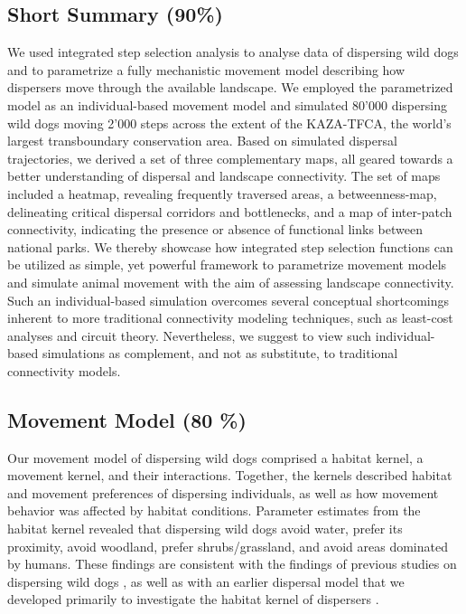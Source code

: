 \documentclass[abstract=on,10pt,a4paper,bibliography=totocnumbered]{article}
\begin{document}
\subsection{Short Summary (90\%)}
We used integrated step selection analysis to analyse data of dispersing wild
dogs and to parametrize a fully mechanistic movement model describing how
dispersers move through the available landscape. We employed the parametrized
model as an individual-based movement model and simulated 80'000 dispersing wild
dogs moving 2'000 steps across the extent of the KAZA-TFCA, the world's largest
transboundary conservation area. Based on simulated dispersal trajectories, we
derived a set of three complementary maps, all geared towards a better
understanding of dispersal and landscape connectivity. The set of maps included
a heatmap, revealing frequently traversed areas, a betweenness-map, delineating
critical dispersal corridors and bottlenecks, and a map of inter-patch
connectivity, indicating the presence or absence of functional links between
national parks. We thereby showcase how integrated step selection functions can
be utilized as simple, yet powerful framework to parametrize movement models and
simulate animal movement with the aim of assessing landscape connectivity. Such
an individual-based simulation overcomes several conceptual shortcomings
inherent to more traditional connectivity modeling techniques, such as
least-cost analyses and circuit theory. Nevertheless, we suggest to view such
individual-based simulations as complement, and not as substitute, to
traditional connectivity models.

\subsection{Movement Model (80 \%)}
Our movement model of dispersing wild dogs comprised a habitat kernel, a
movement kernel, and their interactions. Together, the kernels described habitat
and movement preferences of dispersing individuals, as well as how movement
behavior was affected by habitat conditions. Parameter estimates from the
habitat kernel revealed that dispersing wild dogs avoid water, prefer its
proximity, avoid woodland, prefer shrubs/grassland, and avoid areas dominated by
humans. These findings are consistent with the findings of previous studies on
dispersing wild dogs \citep{DaviesMostert.2012, Masenga.2016, Woodroffe.2019,
Oneill.2020}, as well as with an earlier dispersal model that we developed
primarily to investigate the habitat kernel of dispersers \citep{Hofmann.2021}.
\end{document}
